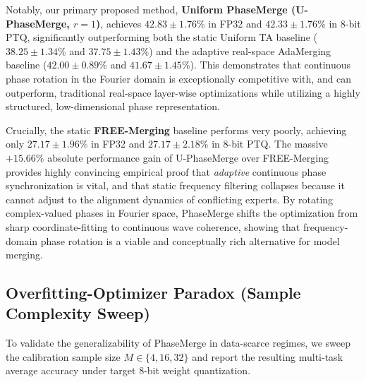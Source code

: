 Notably, our primary proposed method, \textbf{Uniform PhaseMerge (U-PhaseMerge, $r=1$)}, achieves $42.83 \pm 1.76\%$ in FP32 and $42.33 \pm 1.76\%$ in 8-bit PTQ, significantly outperforming both the static Uniform TA baseline ($38.25 \pm 1.34\%$ and $37.75 \pm 1.43\%$) and the adaptive real-space AdaMerging baseline ($42.00 \pm 0.89\%$ and $41.67 \pm 1.45\%$). This demonstrates that continuous phase rotation in the Fourier domain is exceptionally competitive with, and can outperform, traditional real-space layer-wise optimizations while utilizing a highly structured, low-dimensional phase representation.

Crucially, the static \textbf{FREE-Merging} baseline performs very poorly, achieving only $27.17 \pm 1.96\%$ in FP32 and $27.17 \pm 2.18\%$ in 8-bit PTQ. The massive $+15.66\%$ absolute performance gain of U-PhaseMerge over FREE-Merging provides highly convincing empirical proof that \emph{adaptive} continuous phase synchronization is vital, and that static frequency filtering collapses because it cannot adjust to the alignment dynamics of conflicting experts. By rotating complex-valued phases in Fourier space, PhaseMerge shifts the optimization from sharp coordinate-fitting to continuous wave coherence, showing that frequency-domain phase rotation is a viable and conceptually rich alternative for model merging.

\subsection{Overfitting-Optimizer Paradox (Sample Complexity Sweep)}

To validate the generalizability of PhaseMerge in data-scarce regimes, we sweep the calibration sample size $M \in \{4, 16, 32\}$ and report the resulting multi-task average accuracy under target 8-bit weight quantization.

